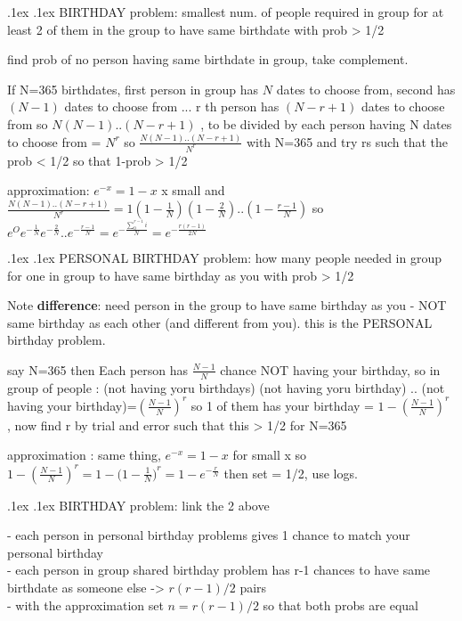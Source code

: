 \documentclass[10pt,landscape,a4paper]{article}
\makeatletter
\renewcommand{\section}{\@startsection{section}{1}{0mm}%
                                {.1ex}%
                                {.1ex}%
                                {\color{blue}\sffamily\small\bfseries}}
\makeatother
\begin{document}
\begin{multicols*}{3}
\begin{spacing}{0.1}
\section{BIRTHDAY problem: smallest num. of people required in group for at least 2 of them in the group to have same birthdate with prob > 1/2}

find prob of no person having same birthdate in group, take complement.

If N=365 birthdates, first person in group has $N$ dates to choose from, second has $(N-1)$ dates to choose from ... r th person has   $(N-r+1)$ dates to choose from so $N(N-1)..(N-r+1)$ , to be divided by each person having N dates to choose from = $N^r$ so $\frac{N(N-1)..(N-r+1)}{N^r}$ with N=365 and try rs such that the prob < 1/2 so that 1-prob > 1/2

approximation: $e^{-x}=1-x$ x small and $\frac{N(N-1)..(N-r+1)}{N^r} = 1(1-\frac{1}{N}) (1-\frac{2}{N}) .. (1-\frac{r-1}{N})$ so $e^{O}e^{-\frac{1}{N}}e^{-\frac{2}{N}}..e^{-\frac{r-1}{N}} = e^{-\frac{{\sum_{0}^{r-1} i}}{N}}=e^{-\frac{r(r-1)}{2N}}$

\section{PERSONAL BIRTHDAY problem: how many people needed in group for one in group to have same birthday as you with prob > 1/2}

Note \textbf{difference}: need person in the group to have same birthday as you - NOT same birthday as each other (and different from you). this is the PERSONAL birthday problem.

say N=365 then Each person has $\frac{N-1}{N}$ chance NOT having your birthday, so in group of people : (not having yoru birthdays) (not having yoru birthday) .. (not having your birthday)=${(\frac{N-1}{N})}^{r}$ so 1 of them has your birthday = $1-{(\frac{N-1}{N})}^{r}$ , now find r by trial and error such that this > 1/2 for N=365

approximation : same thing, $e^{-x}=1-x$ for small x so $1-{(\frac{N-1}{N})}^{r}=1-({1-\frac{1}{N})}^{r}=1-e^{-\frac{r}{N}}$ then set = 1/2, use logs.

\section{BIRTHDAY problem: link the 2 above}

- each person in personal birthday problems gives 1 chance to match your personal birthday\\
- each person in group shared birthday problem has r-1 chances to have same birthdate as someone else -> $r(r-1)/2$ pairs\\
- with the approximation set $n = r(r-1)/2$ so that both probs are equal


\end{spacing}
\end{multicols*}
\end{document}
